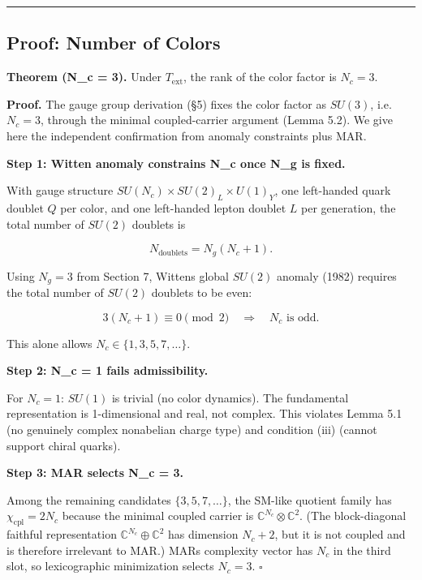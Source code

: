 \begin{center}\rule{0.5\linewidth}{0.5pt}\end{center}

\subsection{Proof: Number of Colors}\label{6-proof-number-of-colors}

\textbf{Theorem (N\_c = 3).} Under \(T_{\mathrm{ext}}\), the rank of the color factor is \(N_c = 3\).

\textbf{Proof.} The gauge group derivation (\S{}5) fixes the color factor as \(SU(3)\), i.e. \(N_c = 3\), through the minimal coupled-carrier argument (Lemma 5.2). We give here the independent confirmation from anomaly constraints plus MAR.

\textbf{Step 1: Witten anomaly constrains N\_c once N\_g is fixed.}

With gauge structure \(SU(N_c) \times SU(2)_L \times U(1)_Y\), one left-handed quark doublet \(Q\) per color, and one left-handed lepton doublet \(L\) per generation, the total number of \(SU(2)\) doublets is

\[N_{\mathrm{doublets}} = N_g(N_c + 1).\]

Using \(N_g = 3\) from Section 7, Witten\textquotesingle s global \(SU(2)\) anomaly (1982) requires the total number of \(SU(2)\) doublets to be even:

\[3(N_c + 1) \equiv 0 \pmod{2} \quad \Longrightarrow \quad N_c \text{ is odd}.\]

This alone allows \(N_c \in \{1, 3, 5, 7, \ldots\}\).

\textbf{Step 2: N\_c = 1 fails admissibility.}

For \(N_c = 1\): \(SU(1)\) is trivial (no color dynamics). The fundamental representation is 1-dimensional and real, not complex. This violates Lemma 5.1 (no genuinely complex nonabelian charge type) and condition (iii) (cannot support chiral quarks).

\textbf{Step 3: MAR selects N\_c = 3.}

Among the remaining candidates \(\{3, 5, 7, \ldots\}\), the SM-like quotient family has \(\chi_{\mathrm{cpl}} = 2N_c\) because the minimal coupled carrier is \(\mathbb{C}^{N_c} \otimes \mathbb{C}^2\). (The block-diagonal faithful representation \(\mathbb{C}^{N_c} \oplus \mathbb{C}^2\) has dimension \(N_c + 2\), but it is not coupled and is therefore irrelevant to MAR.) MAR\textquotesingle s complexity vector has \(N_c\) in the third slot, so lexicographic minimization selects \(N_c = 3\). \(\square\)

